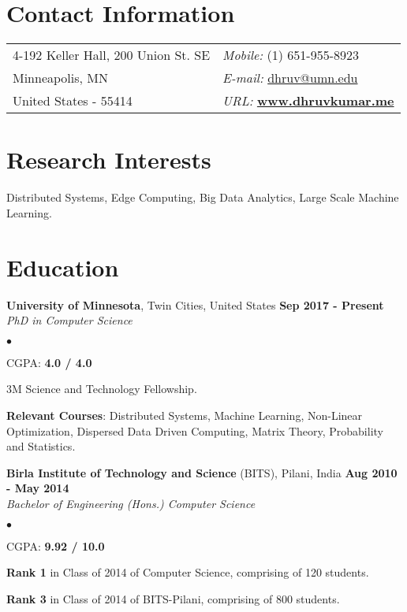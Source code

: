 \documentclass[margin,line]{res}
\newenvironment{list2}{
  \begin{list}{$\bullet$}{%
      \setlength{\itemsep}{0in}
      \setlength{\parsep}{0in} \setlength{\parskip}{0in}
      \setlength{\topsep}{0in} \setlength{\partopsep}{0in} 
      \setlength{\leftmargin}{0.2in}}}{\end{list}}
\begin{document}

\begin{resume}
\section{\sc Contact Information}
\vspace{.05in}
\begin{tabular}{@{}p{3in}p{4in}}
4-192 Keller Hall, 200 Union St. SE         & {\it Mobile:}  (1) 651-955-8923 \\
Minneapolis, MN & {\it E-mail:}  \href{mailto:dhruv@umn.edu }{dhruv@umn.edu }\\
 United States - 55414 &{\it URL:}  \href{http://www.dhruvkumar.me}{\bf www.dhruvkumar.me}
\end{tabular}


\section{\sc Research Interests}
Distributed Systems, Edge Computing, Big Data Analytics, Large Scale Machine Learning.

\section{\sc Education}
{\bf University of Minnesota}, Twin Cities, United States \hfill {\bf {Sep 2017 - Present}}\\
{\em PhD in Computer Science }
\vspace*{.3cm}
\begin{list2}
\item CGPA:  {\bf {4.0 / 4.0}}
\item 3M Science and Technology Fellowship.
\item {\bf Relevant Courses}: Distributed Systems, Machine Learning, Non-Linear Optimization, Dispersed Data Driven Computing, Matrix Theory, Probability and Statistics.

\end{list2}
{\bf Birla Institute of Technology and Science} (BITS), Pilani, India \hfill {\bf {Aug 2010 - May 2014}}\\
{\em Bachelor of Engineering (Hons.) Computer Science }
\vspace*{.3cm}
\begin{list2}
\item CGPA:  {\bf {9.92 / 10.0}}
\item {\bf Rank 1} in Class of 2014 of Computer Science, comprising of 120 students. 
\item {\bf Rank 3} in Class of 2014 of BITS-Pilani, comprising of 800 students.


\end{list2}
\end{resume}
\end{document}

